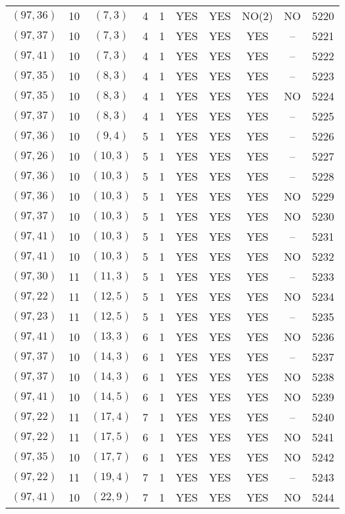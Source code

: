 \begin{longtable}{|c|c|c|c|c|c|c|c|c|c|}
$(97, 36)$ & 10 & $(7, 3)$ & 4 & 1 & YES & YES & NO(2) & NO & 5220\\
$(97, 37)$ & 10 & $(7, 3)$ & 4 & 1 & YES & YES & YES & -- & 5221\\
$(97, 41)$ & 10 & $(7, 3)$ & 4 & 1 & YES & YES & YES & -- & 5222\\
$(97, 35)$ & 10 & $(8, 3)$ & 4 & 1 & YES & YES & YES & -- & 5223\\
$(97, 35)$ & 10 & $(8, 3)$ & 4 & 1 & YES & YES & YES & NO & 5224\\
$(97, 37)$ & 10 & $(8, 3)$ & 4 & 1 & YES & YES & YES & -- & 5225\\
$(97, 36)$ & 10 & $(9, 4)$ & 5 & 1 & YES & YES & YES & -- & 5226\\
$(97, 26)$ & 10 & $(10, 3)$ & 5 & 1 & YES & YES & YES & -- & 5227\\
$(97, 36)$ & 10 & $(10, 3)$ & 5 & 1 & YES & YES & YES & -- & 5228\\
$(97, 36)$ & 10 & $(10, 3)$ & 5 & 1 & YES & YES & YES & NO & 5229\\
$(97, 37)$ & 10 & $(10, 3)$ & 5 & 1 & YES & YES & YES & NO & 5230\\
$(97, 41)$ & 10 & $(10, 3)$ & 5 & 1 & YES & YES & YES & -- & 5231\\
$(97, 41)$ & 10 & $(10, 3)$ & 5 & 1 & YES & YES & YES & NO & 5232\\
$(97, 30)$ & 11 & $(11, 3)$ & 5 & 1 & YES & YES & YES & -- & 5233\\
$(97, 22)$ & 11 & $(12, 5)$ & 5 & 1 & YES & YES & YES & NO & 5234\\
$(97, 23)$ & 11 & $(12, 5)$ & 5 & 1 & YES & YES & YES & -- & 5235\\
$(97, 41)$ & 10 & $(13, 3)$ & 6 & 1 & YES & YES & YES & NO & 5236\\
$(97, 37)$ & 10 & $(14, 3)$ & 6 & 1 & YES & YES & YES & -- & 5237\\
$(97, 37)$ & 10 & $(14, 3)$ & 6 & 1 & YES & YES & YES & NO & 5238\\
$(97, 41)$ & 10 & $(14, 5)$ & 6 & 1 & YES & YES & YES & NO & 5239\\
$(97, 22)$ & 11 & $(17, 4)$ & 7 & 1 & YES & YES & YES & -- & 5240\\
$(97, 22)$ & 11 & $(17, 5)$ & 6 & 1 & YES & YES & YES & NO & 5241\\
$(97, 35)$ & 10 & $(17, 7)$ & 6 & 1 & YES & YES & YES & NO & 5242\\
$(97, 22)$ & 11 & $(19, 4)$ & 7 & 1 & YES & YES & YES & -- & 5243\\
$(97, 41)$ & 10 & $(22, 9)$ & 7 & 1 & YES & YES & YES & NO & 5244\\

\end{longtable}
